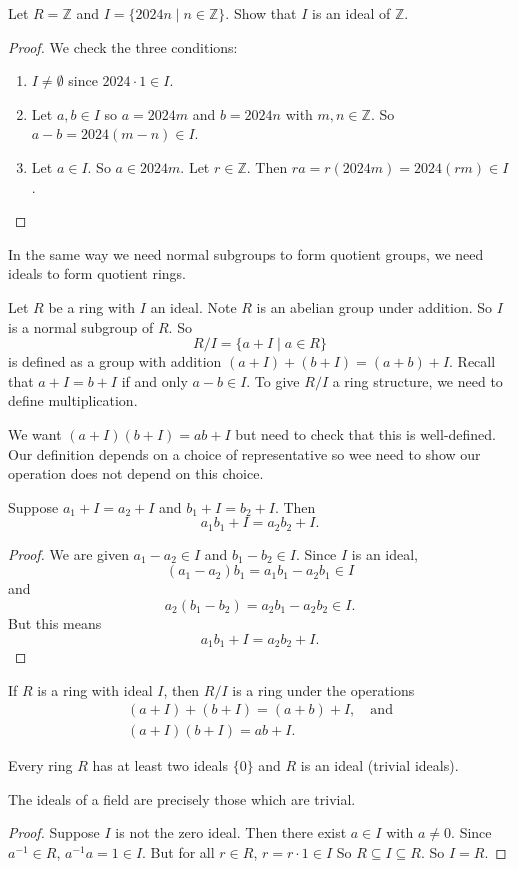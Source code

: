 \begin{example}
	Let $R=\mathbb Z$ and $I=\{2024n\mid n\in\mathbb Z\}$. Show that $I$ is an ideal of $\mathbb Z$.
	\begin{proof}
		We check the three conditions:
		\begin{enumerate}[label=\textbf{(\alph*)}]
			\item $I\neq\emptyset$ since $2024\cdot 1\in I$.
			\item Let $a,b\in I$ so $a=2024m$ and $b=2024n$ with $m,n\in\mathbb Z$. So $a-b=2024(m-n)\in I$.
			\item Let $a\in I$. So $a\in 2024 m$. Let $r\in\mathbb Z$. Then $ra=r(2024m)=2024(rm)\in I$.
		\end{enumerate}
	\end{proof}
\end{example}

In the same way we need normal subgroups to form quotient groups, we need ideals to form quotient rings.

Let $R$ be a ring with $I$ an ideal. Note $R$ is an abelian group under addition. So $I$ is a normal subgroup of $R$. So
$$R/I=\{a+I\mid a\in R\}$$
is defined as a group with addition $(a+I)+(b+I)=(a+b)+I$. Recall that $a+I=b+I$ if and only $a-b\in I$. To give $R/I$ a ring structure, we need to define multiplication.

We want $(a+I)(b+I)=ab+I$ but need to check that this is well-defined. Our definition depends on a choice of representative so wee need to show our operation does not depend on this choice.

\begin{lemma}
	Suppose $a_1+I=a_2+I$ and $b_1+I=b_2+I$. Then
	$$a_1b_1+I=a_2b_2+I.$$
\end{lemma}

\begin{proof}
	We are given $a_1-a_2\in I$ and $b_1-b_2\in I$. Since $I$ is an ideal,
	$$(a_1-a_2)b_1=a_1b_1-a_2b_1\in I$$
	and
	$$a_2(b_1-b_2)=a_2b_1-a_2b_2\in I.$$
	But this means
	$$a_1b_1+I=a_2b_2+I.$$
\end{proof}

\begin{theorem}
	If $R$ is a ring with ideal $I$, then $R/I$ is a ring under the operations
	\begin{gather*}
		(a+I)+(b+I)=(a+b)+I,\quad\text{and}\\
		(a+I)(b+I)=ab+I.
	\end{gather*}
\end{theorem}

Every ring $R$ has at least two ideals $\{0\}$ and $R$ is an ideal (trivial ideals).

\begin{theorem}
	The ideals of a field are precisely those which are trivial.
\end{theorem}

\begin{proof}
	Suppose $I$ is not the zero ideal. Then there exist $a\in I$ with $a\neq 0$. Since $a^{-1}\in R$, $a^{-1}a=1\in I$. But for all $r\in R$, $r=r\cdot 1\in I$ So $R\subseteq I\subseteq R$. So $I=R$.
\end{proof}